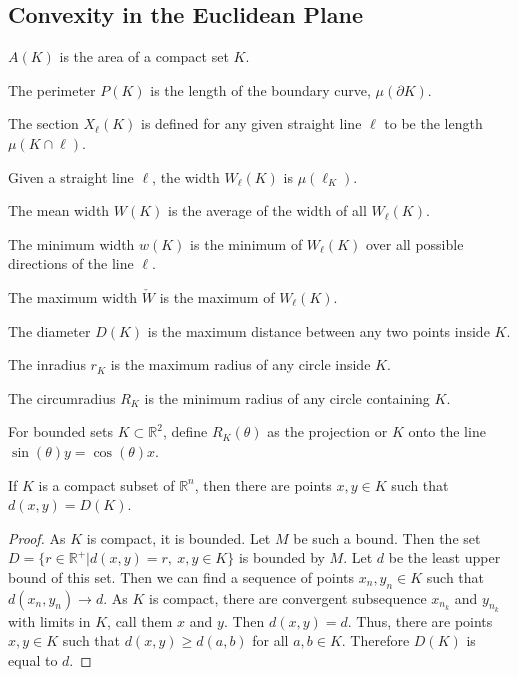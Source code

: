 \documentclass[crop=false,class=book]{standalone}
\begin{document}
\subsection{Convexity in the Euclidean Plane}
\begin{definition}
$A(K)$ is the area of a compact set $K$.
\end{definition}
\begin{definition}
The perimeter $P(K)$ is the length of the boundary curve, $\mu(\partial K)$.
\end{definition}
\begin{definition}
The section $X_{\ell}(K)$ is defined for any given straight line $\ell$ to be the length $\mu(K\cap \ell)$.
\end{definition}
\begin{definition}
Given a straight line $\ell$, the width $W_{\ell}(K)$ is $\mu(\ell_{K})$.
\end{definition}
\begin{definition}
The mean width $W(K)$ is the average of the width of all $W_{\ell}(K)$.
\end{definition}
\begin{definition}
The minimum width $w(K)$ is the minimum of $W_{\ell}(K)$ over all possible directions of the line $\ell$.
\end{definition}
\begin{definition}
The maximum width $\check{W}$ is the maximum of $W_{\ell}(K)$.
\end{definition}
\begin{definition}
The diameter $D(K)$ is the maximum distance between any two points inside $K$.
\end{definition}
\begin{definition}
The inradius $r_K$ is the maximum radius of any circle inside $K$.
\end{definition}
\begin{definition}
The circumradius $R_K$ is the minimum radius of any circle containing $K$.
\end{definition}
\begin{notation}
For bounded sets $K\subset \mathbb{R}^2$, define $R_K(\theta)$ as the projection or $K$ onto the line $\sin(\theta)y=\cos(\theta)x$.
\end{notation}
\begin{theorem}
If $K$ is a compact subset of $\mathbb{R}^n$, then there are points $x,y\in K$ such that $d(x,y)=D(K)$.
\end{theorem}
\begin{proof}
As $K$ is compact, it is bounded. Let $M$ be such a bound. Then the set $D=\{r\in \mathbb{R}^+| d(x,y) = r,\ x,y\in K\}$ is bounded by $M$. Let $d$ be the least upper bound of this set. Then we can find a sequence of points $x_n,y_n\in K$ such that $d(x_n,y_n) \rightarrow d$. As $K$ is compact, there are convergent subsequence $x_{n_k}$ and $y_{n_k}$ with limits in $K$, call them $x$ and $y$. Then $d(x,y) = d$. Thus, there are points $x,y\in K$ such that $d(x,y) \geq d(a,b)$ for all $a,b\in K$. Therefore $D(K)$ is equal to $d$.
\end{proof}
\end{document}
